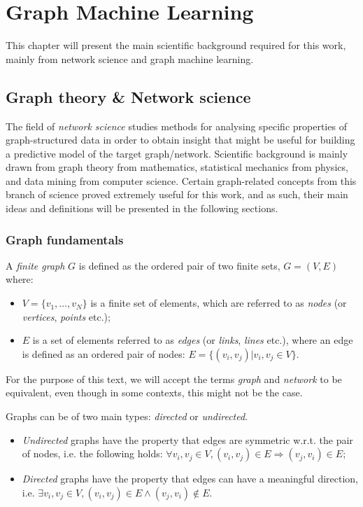 \chapter{Graph Machine Learning}
\label{chp: background}


This chapter will present the main scientific background required for this work, mainly from network science and graph machine learning.

\section{Graph theory \& Network science}
The field of \emph{network science} studies methods for analysing specific properties of graph-structured data in order to obtain insight that might be useful for building a predictive model of the target graph/network. Scientific background is mainly drawn from graph theory from mathematics, statistical mechanics from physics, and data mining from computer science. Certain graph-related concepts from this branch of science proved extremely useful for this work, and as such, their main ideas and definitions will be presented in the following sections.

\subsection{Graph fundamentals}
\begin{definition}
A \emph{finite graph} $G$ is defined as the ordered pair of two finite sets, $G=(V,E)$ where:
\begin{itemize}
\item $V=\{v_1, \dots, v_N\}$ is a finite set of elements, which are referred to as \emph{nodes} (or \emph{vertices}, \emph{points} etc.);
\item $E$ is a set of elements referred to as \emph{edges} (or \emph{links}, \emph{lines} etc.), where an edge is defined as an ordered pair of nodes: $E=\{(v_i,v_j)|v_i,v_j \in V\}$.
\end{itemize}
\end{definition}
For the purpose of this text, we will accept the terms \emph{graph} and \emph{network} to be equivalent, even though in some contexts, this might not be the case.

\begin{definition}
Graphs can be of two main types: \emph{directed} or \emph{undirected}.
\begin{itemize}
\item \emph{Undirected} graphs have the property that edges are symmetric w.r.t. the pair of nodes, i.e. the following holds: $\forall v_i,v_j \in V, (v_i,v_j) \in E \Rightarrow (v_j, v_i) \in E$;
\item \emph{Directed} graphs have the property that edges can have a meaningful direction, i.e. $\exists v_i,v_j \in V, (v_i,v_j) \in E \wedge (v_j, v_i) \not\in E$.
\end{itemize}
\end{definition}

